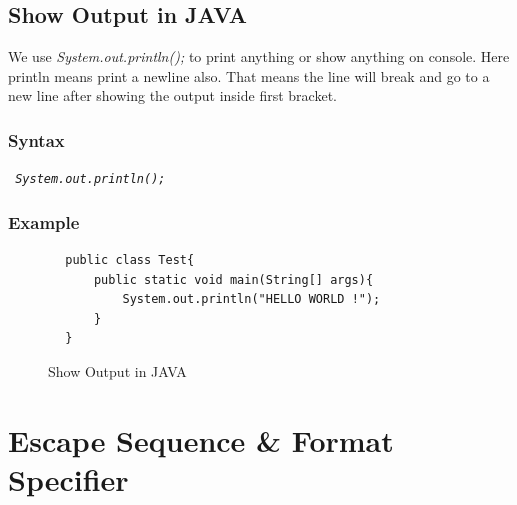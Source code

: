 \documentclass[A4 paper,openany]{book}  %
\begin{document}
% 
% 
\section{Show Output in JAVA}
We use \textit{System.out.println();} to print anything or show anything on console. Here println means print a newline also.
That means the line will break and go to a new line after showing the output inside first bracket.
% 
% 
\subsection{Syntax}
\begin{center}
    \tt{
        \textit{System.out.println();}
    }
\end{center}
% 
% 
\subsection{Example}
\begin{center}
    \begin{verbatim}
        public class Test{
            public static void main(String[] args){
                System.out.println("HELLO WORLD !");
            }
        }
    \end{verbatim}
\end{center}
% 
% 
\begin{figure}[htbp]
    \begin{center}
        \caption{Show Output in JAVA\cite{Ref3}}
    \end{center}
\end{figure}

% 
% 
\chapter{Escape Sequence \& Format Specifier}
% 
%
\end{document}
